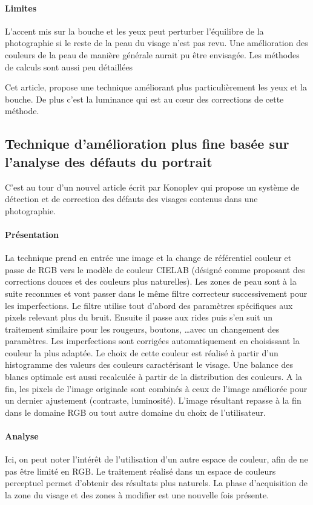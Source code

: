 \documentclass[11pt, french]{report-rd-info}
\begin{document}
\paragraph{Limites}
L’accent mis sur la bouche et les yeux peut perturber l’équilibre de la photographie si le reste de la peau du visage n’est pas revu. Une amélioration des couleurs de la peau de manière générale aurait pu être envisagée. Les méthodes de calculs sont aussi peu détaillées

Cet article, propose une technique améliorant plus particulièrement les yeux et la bouche. De plus c’est la luminance qui est au cœur des corrections de cette méthode.


\subsection{Technique d’amélioration plus fine basée sur l’analyse des défauts du portrait}
C’est au tour d’un nouvel article écrit par Konoplev\cite{Konoplev2012} qui propose un système de détection et de correction des défauts des visages contenus dans une photographie.

\paragraph{Présentation}
La technique prend en entrée une image et la change de référentiel couleur et passe de RGB vers le modèle de couleur CIELAB (désigné comme proposant des corrections douces et des couleurs plus naturelles). Les zones de peau sont à la suite reconnues et vont passer dans le même filtre correcteur successivement pour les imperfections. Le filtre utilise tout d'abord des paramètres spécifiques aux pixels relevant plus du bruit. Ensuite il passe aux rides puis s'en suit un traitement similaire pour les rougeurs, boutons, \ldots avec un changement des paramètres. Les imperfections sont corrigées automatiquement en choisissant la couleur la plus adaptée. Le choix de cette couleur est réalisé à partir d’un histogramme des valeurs des couleurs caractérisant le visage. Une balance des blancs optimale est aussi recalculée à partir de la distribution des couleurs. A la fin, les pixels de l’image originale sont combinés à ceux de l’image améliorée pour un dernier ajustement (contraste, luminosité). L'image résultant repasse à la fin dans le domaine RGB ou tout autre domaine du choix de l’utilisateur.

\paragraph{Analyse}
Ici, on peut noter l'intérêt de l'utilisation d'un autre espace de couleur, afin de ne pas être limité en RGB. Le traitement réalisé dans un espace de couleurs perceptuel permet d'obtenir des résultats plus naturels. La phase d'acquisition de la zone du visage et des zones à modifier est une nouvelle fois présente.
\end{document}
